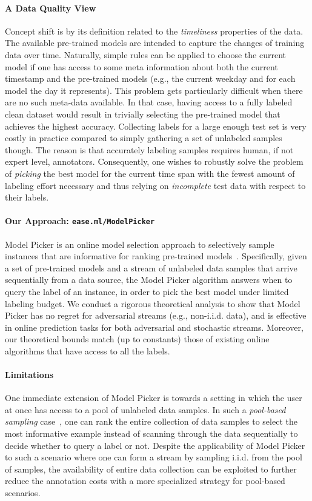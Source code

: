 \documentclass[11pt]{article}
\begin{document}
\paragraph*{A Data Quality View}
Concept shift is by its definition related to the \textit{timeliness} properties of the data. The available pre-trained models are intended to capture the changes of training data over time. Naturally, simple rules can be applied to choose the current model if one has access to some meta information about both the current timestamp and the pre-trained models (e.g., the current weekday and for each model the day it represents).
This problem gets particularly difficult when there are no such meta-data available. In that case, having access to a fully labeled clean dataset would result in trivially selecting the pre-trained model that achieves the highest accuracy. Collecting labels for a large enough test set is very costly in practice compared to simply gathering a set of unlabeled samples though. The reason is that accurately labeling samples requires human, if not expert level, annotators. Consequently, one wishes to robustly solve the problem of \textit{picking} the best model for the current time span with the fewest amount of labeling effort necessary and thus relying on \textit{incomplete} test data with respect to their labels.

\paragraph{Our Approach: \texttt{ease.ml/ModelPicker}}
Model Picker is an online model selection approach to selectively sample instances that are informative for ranking pre-trained models~\cite{karimi2020online}. Specifically, given a set of pre-trained models and a stream of unlabeled data samples that arrive sequentially from a data source, the Model Picker algorithm answers when to query the label of an instance, in order to pick the best model under limited labeling budget. We conduct a rigorous theoretical analysis to show that Model Picker has no regret for adversarial streams (e.g., non-i.i.d. data), and is effective in online prediction tasks for both adversarial and stochastic streams. Moreover, our theoretical bounds match (up to constants) those of existing online algorithms that have access to all the labels. 

\paragraph{Limitations}
One immediate extension of Model Picker is towards a setting in which the user at once has access to a pool of unlabeled data samples. In such a \textit{pool-based sampling} case~\cite{settles2009active}, one can rank the entire collection of data samples to select the most informative example instead of scanning through the data sequentially to decide whether to query a label or not. Despite the applicability of Model Picker to such a scenario where one can form a stream by sampling i.i.d. from the pool of samples, the availability of entire data collection can be exploited to further reduce the annotation costs with a more specialized strategy for pool-based scenarios.
\end{document}
